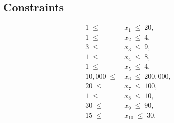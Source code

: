 \documentclass{article}
\begin{document}
\subsection*{Constraints}
\begin{align}
1 \;\le\;& x_1 \;\le\; 20, \\
1 \;\le\;& x_2 \;\le\; 4, \\
3 \;\le\;& x_3 \;\le\; 9, \\
1 \;\le\;& x_4 \;\le\; 8, \\
1 \;\le\;& x_5 \;\le\; 4, \\
10{,}000 \;\le\;& x_6 \;\le\; 200{,}000, \\
20 \;\le\;& x_7 \;\le\; 100, \\
1 \;\le\;& x_8 \;\le\; 10, \\
30 \;\le\;& x_9 \;\le\; 90, \\
15 \;\le\;& x_{10} \;\le\; 30.
\end{align}
\end{document}
